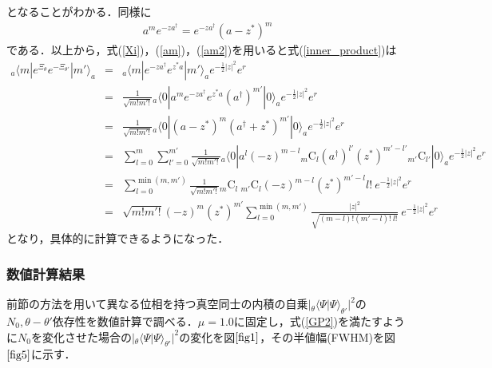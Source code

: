 \documentclass[10.5pt,a4paper]{jreport}
\begin{document}
となることがわかる．同様に
\begin{eqnarray}
  a^me^{-za^\dagger} = e^{-za^\dagger}(a - z^*)^{m}\label{am2}
\end{eqnarray}
である．以上から，式(\ref{Xi})，(\ref{am})，(\ref{am2})を用いると式(\ref{inner_product})は
\begin{eqnarray}
  \nonumber _a\langle m|e^{\Xi_\theta}e^{-\Xi_{\theta'}}|m'\rangle_a &=& _a\langle m|e^{-za^\dagger}e^{z^*a}|m'\rangle_a e^{-\frac{1}{2}|z|^2}e^{r}\\
  \nonumber &=& \frac{1}{\sqrt{m!m'!}}{_a\langle}0|a^me^{-za^\dagger}e^{z^*a}(a^\dagger)^{m'}|0\rangle_ae^{-\frac{1}{2}|z|^2}e^{r}\\
  \nonumber &=& \frac{1}{\sqrt{m!m'!}}{_a\langle}0|(a - z^*)^{m}(a^\dagger + z^*)^{m'}|0\rangle_ae^{-\frac{1}{2}|z|^2}e^{r}\\
  \nonumber &=&\sum_{l=0}^{m}\sum_{l'=0}^{m'}\frac{1}{\sqrt{m!m'!}}{_a\langle}0|a^l(-z)^{m-l}{_m\mathrm{C}_l}(a^\dagger)^{l'}(z^*)^{m'-l'}{_{m'}\mathrm{C}_{l'}}|\nonumber 0\rangle_ae^{-\frac{1}{2}|z|^2}e^{r}\ \ \ \ \ \ \ \ \ \ \\
  \nonumber &=&\sum_{l=0}^{\min(m,m')}\frac{1}{\sqrt{m!m'!}}{_m\mathrm{C}_l}\ {_{m'}\mathrm{C}_l}(-z)^{m-l}(z^*)^{m'-l}l!\ e^{-\frac{1}{2}|z|^2}e^{r}\\
  &=&\sqrt{m!m'!}(-z)^{m}(z^*)^{m'}\sum_{l=0}^{\min(m,m')}\frac{|z|^2}{\sqrt{(m-l)!(m'-l)!\ l!}}\ e^{-\frac{1}{2}|z|^2}e^{r}\label{orthogonal}
\end{eqnarray}
となり，具体的に計算できるようになった．
\subsubsection{数値計算結果}
前節の方法を用いて異なる位相を持つ真空同士の内積の自乗$|_\theta\langle\Psi|\Psi\rangle_{\theta '}|^2$の$N_0,\theta-\theta'$依存性を数値計算で調べる．$\mu=1.0$に固定し，式(\ref{GP2})を満たすように$N_0$を変化させた場合の$|_\theta\langle\Psi|\Psi\rangle_{\theta '}|^2$の変化を図$\ref{fig1}$，その半値幅(FWHM)を図$\ref{fig5}$に示す．
\end{document}
